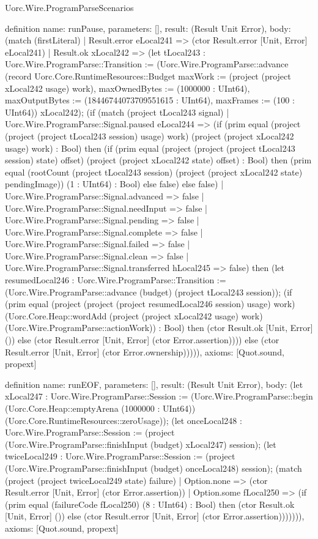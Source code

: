 \begin{lexlean}{Uorc.Wire.ProgramParseScenarios}
\begin{semanticmodule}
definition{
  name: runPause,
  parameters: [],
  result: (Result Unit Error),
  body: (match (firstLiteral)
    | Result.error eLocal241 => (ctor Result.error [Unit, Error] eLocal241)
    | Result.ok xLocal242 => (let tLocal243 : Uorc.Wire.ProgramParse::Transition := (Uorc.Wire.ProgramParse::advance (record Uorc.Core.RuntimeResources::Budget {maxWork := (project (project xLocal242 usage) work), maxOwnedBytes := (1000000 : UInt64), maxOutputBytes := (18446744073709551615 : UInt64), maxFrames := (100 : UInt64)}) xLocal242); (if (match (project tLocal243 signal)
      | Uorc.Wire.ProgramParse::Signal.paused eLocal244 => (if (prim equal (project (project (project tLocal243 session) usage) work) (project (project xLocal242 usage) work) : Bool) then (if (prim equal (project (project (project tLocal243 session) state) offset) (project (project xLocal242 state) offset) : Bool) then (prim equal (rootCount (project tLocal243 session) (project (project xLocal242 state) pendingImage)) (1 : UInt64) : Bool) else false) else false)
      | Uorc.Wire.ProgramParse::Signal.advanced => false
      | Uorc.Wire.ProgramParse::Signal.needInput => false
      | Uorc.Wire.ProgramParse::Signal.pending => false
      | Uorc.Wire.ProgramParse::Signal.complete => false
      | Uorc.Wire.ProgramParse::Signal.failed => false
      | Uorc.Wire.ProgramParse::Signal.clean => false
      | Uorc.Wire.ProgramParse::Signal.transferred hLocal245 => false) then (let resumedLocal246 : Uorc.Wire.ProgramParse::Transition := (Uorc.Wire.ProgramParse::advance (budget) (project tLocal243 session)); (if (prim equal (project (project (project resumedLocal246 session) usage) work) (Uorc.Core.Heap::wordAdd (project (project xLocal242 usage) work) (Uorc.Wire.ProgramParse::actionWork)) : Bool) then (ctor Result.ok [Unit, Error] ()) else (ctor Result.error [Unit, Error] (ctor Error.assertion)))) else (ctor Result.error [Unit, Error] (ctor Error.ownership))))),
  axioms: [Quot.sound, propext]
}

definition{
  name: runEOF,
  parameters: [],
  result: (Result Unit Error),
  body: (let xLocal247 : Uorc.Wire.ProgramParse::Session := (Uorc.Wire.ProgramParse::begin (Uorc.Core.Heap::emptyArena (1000000 : UInt64)) (Uorc.Core.RuntimeResources::zeroUsage)); (let onceLocal248 : Uorc.Wire.ProgramParse::Session := (project (Uorc.Wire.ProgramParse::finishInput (budget) xLocal247) session); (let twiceLocal249 : Uorc.Wire.ProgramParse::Session := (project (Uorc.Wire.ProgramParse::finishInput (budget) onceLocal248) session); (match (project (project twiceLocal249 state) failure)
    | Option.none => (ctor Result.error [Unit, Error] (ctor Error.assertion))
    | Option.some fLocal250 => (if (prim equal (failureCode fLocal250) (8 : UInt64) : Bool) then (ctor Result.ok [Unit, Error] ()) else (ctor Result.error [Unit, Error] (ctor Error.assertion))))))),
  axioms: [Quot.sound, propext]
}


\end{semanticmodule}
\end{lexlean}

